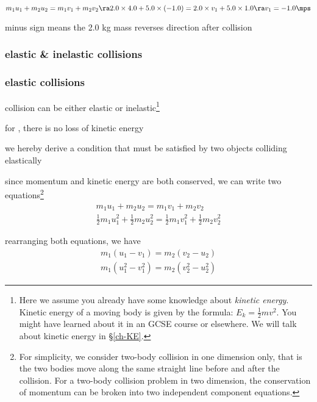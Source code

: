 \solc\begin{equation*}
m_1 u_1 + m_2 u_2 = m_1 v_1 + m_2 v_2 \ra 2.0\times4.0+5.0\times(-1.0) = 2.0 \times v_1 + 5.0\times1.0 \ra v_1 = -1.0 \mps
\end{equation*}

minus sign means the 2.0 kg mass reverses direction after collision \eoe

\subsubsection{elastic \& inelastic collisions}

\subsubsection*{elastic collisions}

collision can be either elastic or inelastic\footnote{Here we assume you already have some knowledge about \emph{kinetic energy}. Kinetic energy of a moving body is given by the formula: $E_k = \frac{1}{2}mv^2$. You might have learned about it in an GCSE course or elsewhere. We will talk about kinetic energy in \S\ref{ch-KE}.}

\begin{ilight}
	for , there is no loss of kinetic energy
\end{ilight}



we hereby derive a condition that must be satisfied by two objects colliding elastically

since momentum and kinetic energy are both conserved, we can write two equations\footnote{For simplicity, we consider two-body collision in one dimension only, that is the two bodies move along the same straight line before and after the collision. For a two-body collision problem in two dimension, the conservation of momentum can be broken into two independent component equations.}
\begin{gather*}
	\boxed { m_1 u_1 + m_2 u_2 = m_1 v_1 + m_2 v_2 }\\
	\boxed { \frac{1}{2}m_1 u_1^2 + \frac{1}{2}m_2 u_2^2 = \frac{1}{2}m_1 v_1^2 + \frac{1}{2}m_2 v_2^2  }
\end{gather*}

rearranging both equations, we have
\begin{gather}
m_1 (u_1 - v_1) = m_2 (v_2 - u_2) \tag{1}\\
m_1 (u_1^2 - v_1^2) = m_2 (v_2^2 - u_2^2)  \tag{2}
\end{gather}

